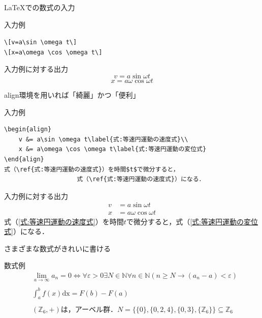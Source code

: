 \documentclass[dvipdfmx]{beamer}
\begin{document}
\begin{frame}[fragile]{\LaTeX での数式の入力}
    \begin{exampleblock}{入力例}
        \begin{center}
            \verb|\[v=a\sin \omega t\]|\\
            \verb|\[x=a\omega \cos \omega t\]|
        \end{center}
    \end{exampleblock}
    \begin{exampleblock}{入力例に対する出力}
        \[v=a\sin \omega t\]
        \[x=a\omega \cos \omega t\]
    \end{exampleblock}
\end{frame}

\begin{frame}[fragile]{align環境を用いれば「綺麗」かつ「便利」}
    \begin{exampleblock}{入力例}
        \begin{verbatim}
\begin{align}
    v &= a\sin \omega t\label{式:等速円運動の速度式}\\
    x &= a\omega \cos \omega t\label{式:等速円運動の変位式}
\end{align}
式（\ref{式:等速円運動の速度式}）を時間$t$で微分すると，
                    式（\ref{式:等速円運動の速度式}）になる．
        \end{verbatim}
    \end{exampleblock}
    \begin{exampleblock}{入力例に対する出力}
        \begin{align}
            v & = a\sin \omega t\label{式:等速円運動の速度式}        \\
            x & = a\omega \cos \omega t\label{式:等速円運動の変位式}
        \end{align}
        式（\ref{式:等速円運動の速度式}）を時間$t$で微分すると，式（\ref{式:等速円運動の変位式}）になる．
    \end{exampleblock}
\end{frame}
\begin{frame}{さまざまな数式がきれいに書ける}
    \begin{exampleblock}{数式例}
        \begin{align*}
             & \lim_{a\to \infty}a_n=0\Leftrightarrow\forall \varepsilon >0\exists N\in\mathbb{N}\forall n\in\mathbb{N}(n\geq N\to (a_n-a)<\varepsilon)\tag{1学年1Q：コーシーの収束の定義} \\\\
             & \int_{a}^{b}f(x)\textrm{dx}=F(b)-F(a)\tag{1学年3Q：微積分学の基本定理}                                                                                                      \\\\
             & (\mathbb{Z}_6,+)\textrm{は，アーベル群．}N=\{\{0\},\{0,2,4\},\{0,3\},\{\mathbb{Z}_6\}\}\subseteq\mathbb{Z}_6 \tag{2学年1Q：代数学概論 群論 部分群}
        \end{align*}
    \end{exampleblock}
\end{frame}
\end{document}

